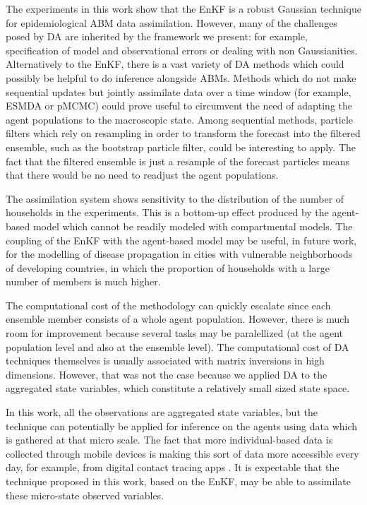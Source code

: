 \documentclass[11pt,a4paper]{article}
\begin{document}
The experiments in this work show that the EnKF is a robust Gaussian technique for epidemiological ABM data assimilation. However, many of the challenges posed by DA are inherited by the framework we present: for example, specification of model and observational errors or dealing with non Gaussianities. Alternatively to the EnKF, there is a vast variety of DA methods which could possibly be helpful to do inference alongside ABMs. Methods which do not make sequential updates but jointly assimilate data over a time window (for example, ESMDA or pMCMC) could prove useful to circumvent the need of adapting the agent populations to the macroscopic state. Among sequential methods, particle filters which rely on resampling in order to transform the forecast into the filtered ensemble, such as the bootstrap particle filter, could be interesting to apply. The fact that the filtered ensemble is just a resample of the forecast particles means that there would be no need to readjust the agent populations.

The assimilation system shows sensitivity to the distribution of the number of households in the experiments. This is a bottom-up effect produced by the agent-based model which cannot be readily modeled with compartmental models. The coupling of the EnKF with the agent-based model may be useful, in future work, for the modelling of disease propagation in cities with vulnerable neighborhoods of developing countries, in which the proportion of households with a large number of members is much higher.

The computational cost of the methodology can quickly escalate since each ensemble member consists of a whole agent population. However, there is much room for improvement because several tasks may be paralellized (at the agent population level and also at the ensemble level). The computational cost of DA techniques themselves is usually associated with matrix inversions in high dimensions. However, that was not the case because we applied DA to the aggregated state variables, which constitute a relatively small sized state space.

In this work, all the observations are aggregated state variables, but the technique can potentially be applied for inference on the agents using data which is gathered at that micro scale. The fact that more individual-based data is collected through mobile devices is making this sort of data more accessible every day, for example, from digital contact tracing apps \citep{Munzert2021,Lopez2021}. It is expectable that the technique proposed in this work, based on the EnKF, may be able to assimilate these micro-state observed variables.

\clearpage



\end{document}
